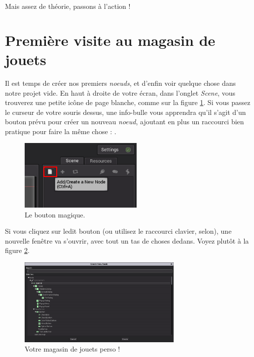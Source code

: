 Mais assez de théorie, passons à l'action !

\section{Première visite au magasin de jouets}

Il est temps de créer nos premiers \emph{noeuds}, et d'enfin voir quelque chose dans notre projet vide. En haut à droite de votre écran, dans l'onglet \emph{Scene}, vous trouverez une petite icône de page blanche, comme sur la figure \ref{lvl1-screen5}. Si vous passez le curseur de votre souris dessus, une info-bulle vous apprendra qu'il s'agit d'un bouton prévu pour créer un nouveau \emph{noeud}, ajoutant en plus un raccourci bien pratique pour faire la même chose : .


\begin{figure}
  \begin{center}
    \includegraphics[width=6cm]{img/lvl1-screen5.png}
  \end{center}
  \caption{\label{lvl1-screen5} Le bouton magique.}
\end{figure}

Si vous cliquez sur ledit bouton (ou utilisez le raccourci clavier, selon), une nouvelle fenêtre va s'ouvrir, avec tout un tas de choses dedans. Voyez plutôt à la figure \ref{lvl1-screen6}.

\begin{figure}
  \begin{center}
    \includegraphics[width=8cm]{img/lvl1-screen6.png}
  \end{center}
  \caption{\label{lvl1-screen6} Votre magasin de jouets perso !}
\end{figure}

